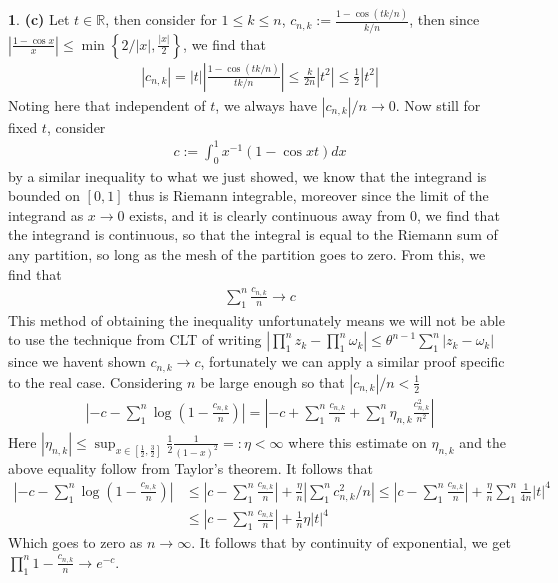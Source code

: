 \documentclass{article}
\theoremstyle{definition}
\newtheorem{pb}{}
\newcommand{\set}[1]{\left\{#1\right\}}
\newcommand{\abs}[1]{\left\vert#1\right\vert}
\begin{document}
\begin{pb}
        \textbf{(c)} Let \(t \in \mathbb{R}\), then consider for \(1 \leq k \leq n\), \(c_{n,k} := \frac{1 - \cos(tk/n)}{k/n}\), then since \(\abs{\frac{1 - \cos x}{x}} \leq \min\set{2/\abs{x},\frac{\abs{x}}{2}}\), we find that
        \begin{align*}
            \abs{c_{n,k}} = \abs{t}\abs{\frac{1 - \cos(tk/n)}{tk/n}} \leq \frac{k}{2n}\abs{t^2} \leq \frac{1}{2}\abs{t^2}
        \end{align*}
        Noting here that independent of \(t\), we always have \(\abs{c_{n,k}}/n \to 0\). Now still for fixed \(t\), consider
        \begin{align*}
            c := \int_0^1 x^{-1}(1-\cos xt)dx
        \end{align*}
        by a similar inequality to what we just showed, we know that the integrand is bounded on \([0,1]\) thus is Riemann integrable, moreover since the limit of the integrand as \(x \to 0\) exists, and it is clearly continuous away from \(0\), we find that the integrand is continuous, so that the integral is equal to the Riemann sum of any partition, so long as the mesh of the partition goes to zero. From this, we find that
        \begin{align*}
            \sum_1^n \frac{c_{n,k}}{n} \to c
        \end{align*}
        This method of obtaining the inequality unfortunately means we will not be able to use the technique from CLT of writing \(\abs{\prod_1^n z_k - \prod_1^n \omega_k} \leq \theta^{n-1}\sum_1^n \abs{z_k-\omega_k}\) since we havent shown \(c_{n,k} \to c\), fortunately we can apply a similar proof specific to the real case. Considering \(n\) be large enough so that \(\abs{c_{n,k}}/n < \frac12\)
        \begin{align*}
            \abs{-c - \sum_1^n \log(1-\frac{c_{n,k}}{n})} = \abs{-c + \sum_1^n \frac{c_{n,k}}{n} + \sum_1^n \eta_{n,k}\frac{c_{n,k}^2}{n^2}}
        \end{align*}
        Here \(\abs{\eta_{n,k}} \leq \sup_{x \in [\frac{1}{2},\frac32]}\frac{1}{2}\frac{1}{(1-x)^2} =: \eta < \infty\) where this estimate on \(\eta_{n,k}\) and the above equality follow from Taylor's theorem.
        It follows that
        \begin{align*}
            \abs{-c - \sum_1^n \log(1-\frac{c_{n,k}}{n})} &\leq \abs{c - \sum_1^n \frac{c_{n,k}}{n}} + \frac{\eta}{n}\abs{\sum_1^n c_{n,k}^2/n} \leq \abs{c - \sum_1^n \frac{c_{n,k}}{n}} + \frac{\eta}{n} \sum_1^n \frac{1}{4n}\abs{t}^4 \\
            &\leq \abs{c - \sum_1^n \frac{c_{n,k}}{n}} + \frac{1}{n}\eta\abs{t}^4
        \end{align*}
        Which goes to zero as \(n \to \infty\). It follows that by continuity of exponential, we get \(\prod_1^n 1 - \frac{c_{n,k}}{n} \to e^{-c}\).


\end{pb}
\end{document}
